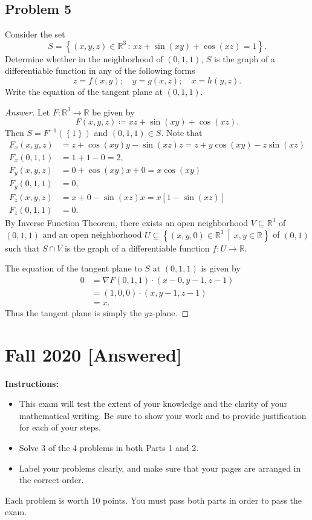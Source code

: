 \documentclass[12pt]{article}
\newcommand{\real}{\mathbb{R}}
\newcommand\inv[1]{#1^{-1}}
\newcommand\paren[1]{\left( #1 \right)}
\newcommand\setb[1]{\left \{ #1 \right \}}
\newcommand{\sqbrack}[1]{\left [ #1 \right ]}
\theoremstyle{definition}
\begin{document}
\subsection{Problem 5}
Consider the set
\[
    S = \setb{ (x,y,z) \in \real^3 \, : \, xz + \sin(xy) + \cos(xz) = 1 }.
\]
Determine whether in the neighborhood of $(0,1,1)$, $S$ is the graph of a differentiable function in any of the following forms
\[
    z = f(x,y); \quad y = g(x,z); \quad x = h(y,z).
\]
Write the equation of the tangent plane at $(0,1,1)$.
\begin{proof}[Answer]
    Let $F : \real^3 \to \real$ be given by 
    \[
        F(x,y,z) \coloneqq xz + \sin(xy) + \cos(xz).
    \]
    Then $S = \inv{F} \paren{ \setb{1} }$ and $(0,1,1) \in S$. Note that 
    \begin{align*}
        F_x(x,y,z) & = z + \cos(xy)y - \sin(xz)z = z + y\cos(xy) - z\sin(xz) \\
        F_x(0,1,1) & = 1 + 1 - 0 = 2, \\
        F_y(x,y,z) & = 0 + \cos(xy)x + 0 = x\cos(xy) \\
        F_y(0,1,1) & = 0, \\
        F_z(x,y,z) & = x + 0 -\sin(xz)x = x \sqbrack{ 1 - \sin(xz) } \\
        F_z(0,1,1) & = 0.
    \end{align*}
    By Inverse Function Theorem, there exists an open neighborhood $V \subseteq \real^3$ of $(0,1,1)$ and an open neighborhood $U \subseteq \setb{ (x,y,0) \in \real^3 \, \middle| \, x,y \in \real }$ of $(0,1)$ such that $S \cap V$ is the graph of a differentiable function $f : U \to \real$. 
    
    The equation of the tangent plane to $S$ at $(0,1,1)$ is given by 
    \begin{align*}
        0 & = \nabla F(0,1,1) \cdot (x - 0 , y - 1 , z - 1) \\
        & = (1,0,0) \cdot (x,y-1,z-1) \\
        & = x.
    \end{align*}
    Thus the tangent plane is simply the $yz$-plane.
\end{proof}
\newpage
\section{Fall 2020 [Answered]}
\noindent \textbf{Instructions:}
\begin{itemize}
    \item This exam will test the extent of your knowledge and the clarity of your mathematical writing. Be sure to show your work and to provide justification for each of your steps.
    \item Solve 3 of the 4 problems in both Parts 1 and 2.
    \item Label your problems clearly, and make sure that your pages are arranged in the correct order.
\end{itemize}
Each problem is worth 10 points. You must pass both parts in order to pass the exam.
\end{document}
